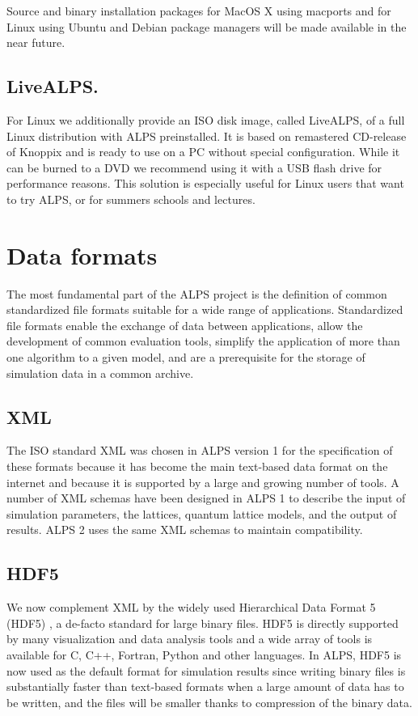 \documentclass[12pt]{iopart}
\begin{document}
Source and binary installation packages for MacOS X using macports \cite{macports} and for Linux using Ubuntu and Debian package managers will be made available in the near future.


\subsection{LiveALPS.}

For Linux we additionally provide an ISO disk image, called LiveALPS, of a full Linux distribution with ALPS preinstalled.  It is  
based on remastered CD-release of Knoppix \cite{knoppix} and is ready to use 
on a PC without special configuration. While it can be burned to a DVD we recommend using it with a USB flash drive for performance reasons.
This  solution is especially useful for Linux users that want to try ALPS, or for summers schools and lectures.

\section{Data formats}

The most fundamental part of the ALPS project is the definition of
common standardized file formats suitable for a wide range of
applications. Standardized file formats enable the exchange of data
between applications, allow the development of common evaluation
tools, simplify the application of more than one algorithm to a given
model, and are a prerequisite for the storage of simulation data in a
common archive.

\subsection{XML}
 The ISO
standard XML \cite{xml} was chosen in ALPS version 1 \cite{ALPS1.2,ALPS1.3} for the specification of these formats
because it has become
the main text-based data format on the internet and because it is
supported by a large and growing number of tools.
A number of XML  schemas \cite{xmlschema} have been designed in ALPS 1 to describe the input of simulation parameters,  the lattices,  quantum lattice models, and the output of results. ALPS 2 uses the same XML schemas to maintain compatibility.

\subsection{HDF5}

We now complement XML by the widely used Hierarchical Data Format 5 (HDF5) \cite{hdf5}, a de-facto standard for large binary files.  HDF5 is directly supported by many visualization and data analysis tools and a wide array of tools is 
available for C, C++, Fortran, Python and other languages. In ALPS, HDF5 is now used as the default format for simulation results since writing binary files is substantially faster than text-based formats when a large amount of data has to be written, and the files will be smaller thanks to compression of the binary data. 
\end{document}
